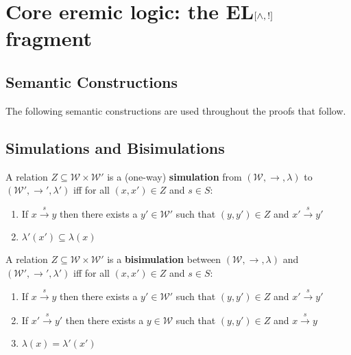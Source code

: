 \section{Core eremic logic: the EL$[\land, !]$ fragment}

\subsection{Semantic Constructions}
The following semantic constructions are used throughout the proofs that follow.
\subsection{Simulations and Bisimulations}

A relation $Z \subseteq \mathcal{W} \times \mathcal{W}'$ is a (one-way) {\bf simulation} from  $(\mathcal{W}, \rightarrow, \lambda)$ to $(\mathcal{W}', \rightarrow', \lambda')$ iff for all $(x,x') \in Z$ and $s \in S$:
\begin{enumerate}
\item
If $x \xrightarrow{s} y$ then there exists a $y' \in \mathcal{W}'$ such that $(y,y') \in Z$ and $x' \xrightarrow{s} y'$
\item
$\lambda'(x') \subseteq \lambda(x)$
\end{enumerate}
A relation $Z \subseteq \mathcal{W} \times \mathcal{W}'$ is a {\bf bisimulation} between  $(\mathcal{W}, \rightarrow, \lambda)$ and $(\mathcal{W}', \rightarrow', \lambda')$ iff for all $(x,x') \in Z$ and $s \in S$:
\begin{enumerate}
\item
If $x \xrightarrow{s} y$ then there exists a $y' \in \mathcal{W}'$ such that $(y,y') \in Z$ and $x' \xrightarrow{s} y'$
\item
If $x' \xrightarrow{s} y'$ then there exists a $y \in \mathcal{W}$ such that $(y,y') \in Z$ and $x \xrightarrow{s} y$
\item
$\lambda(x) = \lambda'(x')$
\end{enumerate}


